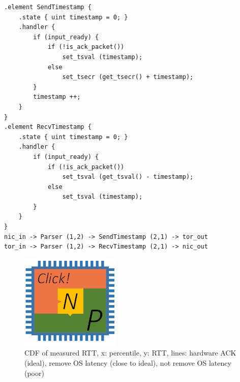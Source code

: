 {\begin{lstlisting}
.element SendTimestamp {
    .state { uint timestamp = 0; }
    .handler {
        if (input_ready) {
            if (!is_ack_packet())
                set_tsval (timestamp);
            else
                set_tsecr (get_tsecr() + timestamp);
        }
        timestamp ++;
    }
}
.element RecvTimestamp {
    .state { uint timestamp = 0; }
    .handler {
        if (input_ready) {
            if (!is_ack_packet())
                set_tsval (get_tsval() - timestamp);
            else
                set_tsval (timestamp);
        }
    }
}
nic_in -> Parser (1,2) -> SendTimestamp (2,1) -> tor_out
tor_in -> Parser (1,2) -> RecvTimestamp (2,1) -> nic_out
\end{lstlisting}

\begin{figure}[h!]
	\centering
	\includegraphics[width=0.6\columnwidth]{image/logo}
	\vspace{-0.15in}
	\caption{CDF of measured RTT, x: percentile, y: RTT, lines: hardware ACK (ideal), remove OS latency (close to ideal), not remove OS latency (poor)}
	\vspace{-0.15in}
	\label{clicknp:fig:TimestampAccuracy}
\end{figure}
}

